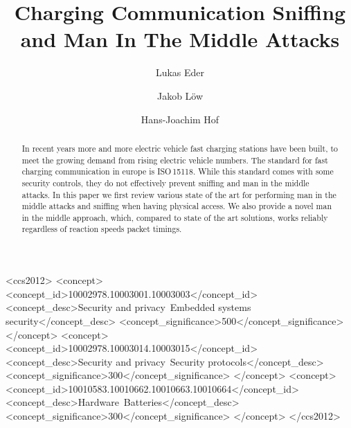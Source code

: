 \documentclass[sigconf]{acmart}
\begin{document}
\title{Charging Communication Sniffing and Man In The Middle Attacks}

\author{Lukas Eder}
\author{Jakob Löw}
\authornotemark[1]

\author{Hans-Joachim Hof}

\renewcommand{\shortauthors}{Eder, Loew et al.}

\begin{abstract}
In recent years more and more electric vehicle fast charging stations have been built, to meet the growing demand from rising electric vehicle numbers.
The standard for fast charging communication in europe is ISO\,15118.
While this standard comes with some security controls, they do not effectively prevent sniffing and man in the middle attacks.
In this paper we first review various state of the art for performing man in the middle attacks and sniffing when having physical access.
We also provide a novel man in the middle approach, which, compared to state of the art solutions, works reliably regardless of reaction speeds packet timings.
\end{abstract}

\begin{CCSXML}
<ccs2012>
   <concept>
       <concept_id>10002978.10003001.10003003</concept_id>
       <concept_desc>Security and privacy~Embedded systems security</concept_desc>
       <concept_significance>500</concept_significance>
       </concept>
   <concept>
       <concept_id>10002978.10003014.10003015</concept_id>
       <concept_desc>Security and privacy~Security protocols</concept_desc>
       <concept_significance>300</concept_significance>
       </concept>
   <concept>
       <concept_id>10010583.10010662.10010663.10010664</concept_id>
       <concept_desc>Hardware~Batteries</concept_desc>
       <concept_significance>300</concept_significance>
       </concept>
 </ccs2012>
\end{CCSXML}
\end{document}
